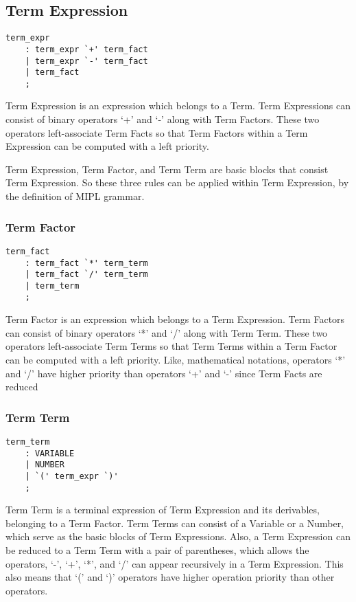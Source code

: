 \documentclass[prodmode,acmtecs]{acmsmall}
\begin{document}

\subsection{Term Expression}
\begin{lstlisting}
term_expr
	: term_expr `+' term_fact
	| term_expr `-' term_fact
	| term_fact
	;
\end{lstlisting}

Term Expression is an expression which belongs to a Term.  Term 
Expressions can consist of binary operators `+' and `-' along with Term
Factors.  These two operators left-associate Term Facts so that Term
Factors within a Term Expression can be computed with a left priority.

Term Expression, Term Factor, and Term Term are basic blocks that
consist Term Expression.  So these three rules can be applied within
Term Expression, by the definition of MIPL grammar.

\subsubsection{Term Factor}

\begin{lstlisting}
term_fact
	: term_fact `*' term_term
	| term_fact `/' term_term
	| term_term
	;
\end{lstlisting}

Term Factor is an expression which belongs to a Term Expression.  Term 
Factors can consist of binary operators `*' and `/' along with Term
Term.  These two operators left-associate Term Terms so that Term
Terms within a Term Factor can be computed with a left priority. Like,
mathematical notations, operators `*' and `/' have higher priority than
operators `+' and `-' since Term Facts are reduced 


\subsubsection{Term Term}
\begin{lstlisting}
term_term
	: VARIABLE
	| NUMBER
	| `(' term_expr `)'
	;
\end{lstlisting}

Term Term is a terminal expression of Term Expression and its derivables,
belonging to a Term Factor.  Term Terms can consist of a Variable or a
Number, which serve as the basic blocks of Term Expressions.  Also, a Term
Expression can be reduced to a Term Term with a pair of parentheses, which
allows the operators, `-', `+', `*', and `/' can appear recursively in a
Term Expression.  This also means that `(' and `)' operators have higher
operation priority than other operators.
\end{document}
